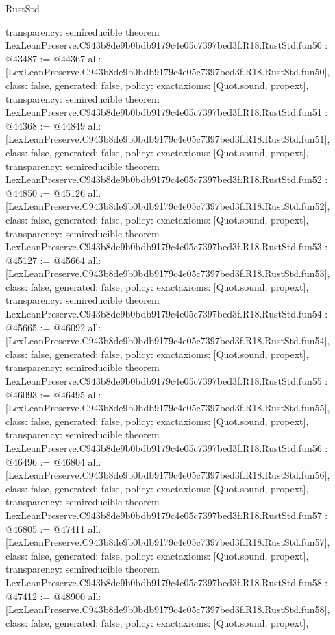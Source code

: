 \begin{lexlean}{RustStd}
\begin{coremodule}
{  transparency: semireducible
}
theorem LexLeanPreserve.C943b8de9b0bdb9179c4e05c7397bed3f.R18.RustStd.fun50 : @43487 := @44367 {
  all: [LexLeanPreserve.C943b8de9b0bdb9179c4e05c7397bed3f.R18.RustStd.fun50],
  class: false,
  generated: false,
  policy: exact{axioms: [Quot.sound, propext]},
  transparency: semireducible
}
theorem LexLeanPreserve.C943b8de9b0bdb9179c4e05c7397bed3f.R18.RustStd.fun51 : @44368 := @44849 {
  all: [LexLeanPreserve.C943b8de9b0bdb9179c4e05c7397bed3f.R18.RustStd.fun51],
  class: false,
  generated: false,
  policy: exact{axioms: [Quot.sound, propext]},
  transparency: semireducible
}
theorem LexLeanPreserve.C943b8de9b0bdb9179c4e05c7397bed3f.R18.RustStd.fun52 : @44850 := @45126 {
  all: [LexLeanPreserve.C943b8de9b0bdb9179c4e05c7397bed3f.R18.RustStd.fun52],
  class: false,
  generated: false,
  policy: exact{axioms: [Quot.sound, propext]},
  transparency: semireducible
}
theorem LexLeanPreserve.C943b8de9b0bdb9179c4e05c7397bed3f.R18.RustStd.fun53 : @45127 := @45664 {
  all: [LexLeanPreserve.C943b8de9b0bdb9179c4e05c7397bed3f.R18.RustStd.fun53],
  class: false,
  generated: false,
  policy: exact{axioms: [Quot.sound, propext]},
  transparency: semireducible
}
theorem LexLeanPreserve.C943b8de9b0bdb9179c4e05c7397bed3f.R18.RustStd.fun54 : @45665 := @46092 {
  all: [LexLeanPreserve.C943b8de9b0bdb9179c4e05c7397bed3f.R18.RustStd.fun54],
  class: false,
  generated: false,
  policy: exact{axioms: [Quot.sound, propext]},
  transparency: semireducible
}
theorem LexLeanPreserve.C943b8de9b0bdb9179c4e05c7397bed3f.R18.RustStd.fun55 : @46093 := @46495 {
  all: [LexLeanPreserve.C943b8de9b0bdb9179c4e05c7397bed3f.R18.RustStd.fun55],
  class: false,
  generated: false,
  policy: exact{axioms: [Quot.sound, propext]},
  transparency: semireducible
}
theorem LexLeanPreserve.C943b8de9b0bdb9179c4e05c7397bed3f.R18.RustStd.fun56 : @46496 := @46804 {
  all: [LexLeanPreserve.C943b8de9b0bdb9179c4e05c7397bed3f.R18.RustStd.fun56],
  class: false,
  generated: false,
  policy: exact{axioms: [Quot.sound, propext]},
  transparency: semireducible
}
theorem LexLeanPreserve.C943b8de9b0bdb9179c4e05c7397bed3f.R18.RustStd.fun57 : @46805 := @47411 {
  all: [LexLeanPreserve.C943b8de9b0bdb9179c4e05c7397bed3f.R18.RustStd.fun57],
  class: false,
  generated: false,
  policy: exact{axioms: [Quot.sound, propext]},
  transparency: semireducible
}
theorem LexLeanPreserve.C943b8de9b0bdb9179c4e05c7397bed3f.R18.RustStd.fun58 : @47412 := @48900 {
  all: [LexLeanPreserve.C943b8de9b0bdb9179c4e05c7397bed3f.R18.RustStd.fun58],
  class: false,
  generated: false,
  policy: exact{axioms: [Quot.sound, propext]},
}
\end{coremodule}
\end{lexlean}
